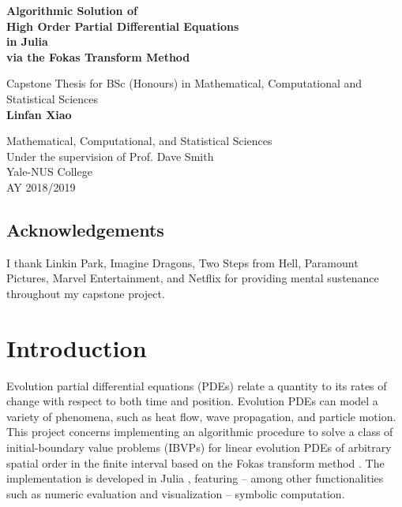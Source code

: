 \documentclass[12pt, oneside, a4paper]{article}
\begin{document}
\begin{titlepage}
\begin{center}
\vspace{1cm}
\LARGE
\textbf{Algorithmic Solution of\\ High Order Partial Differential Equations\\
in Julia\\ via the Fokas Transform Method}

\Large
\vspace{.5cm}
Capstone Thesis for BSc (Honours) in
Mathematical, Computational and Statistical Sciences\\
\vspace{.5cm}
\textbf{Linfan Xiao}\\
\vspace{.5cm}
\Large
\vspace{.5cm}
\Large
\end{center}

\vfill
\large
\begin{center}	
Mathematical, Computational, and Statistical Sciences\\
Under the supervision of Prof. Dave Smith\\
Yale-NUS College\\
AY 2018/2019\\
\end{center}
\end{titlepage}
\tableofcontents
\pagebreak
{}
\begin{center}\section*{Acknowledgements}\end{center}
I thank Linkin Park, Imagine Dragons, Two Steps from Hell, Paramount Pictures, Marvel Entertainment, and Netflix for providing mental sustenance throughout my capstone project.

\pagebreak
{}

\section{Introduction}\label{sec:intro}
Evolution partial differential equations (PDEs) relate a quantity to its rates of change with respect to both time and position. Evolution PDEs can model a variety of phenomena, such as heat flow, wave propagation, and particle motion. This project concerns implementing an algorithmic procedure to solve a class of initial-boundary value problems (IBVPs) for linear evolution PDEs of arbitrary spatial order in the finite interval \cite{Smith2016} based on the Fokas transform method \cite{Fokas2000}\cite{Fokas2001}\cite{Fokas2008}\cite{Smith2012}\cite{Deconinck2014}\cite{Fokas2015}. The implementation is developed in Julia \cite{julia}, featuring -- among other functionalities such as numeric evaluation and visualization -- symbolic computation.
\end{document}
